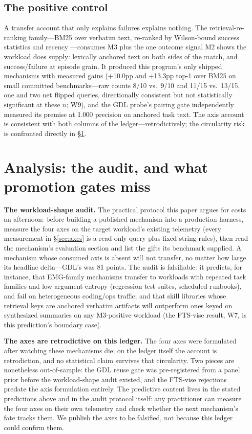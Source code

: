 \documentclass[11pt]{article}
\begin{document}
\subsection{The positive control}

A transfer account that only explains failures explains nothing. The retrieval-re-ranking family---BM25 over verbatim text, re-ranked by Wilson-bound success statistics and recency \citep{wilson1927probable}---consumes M3 plus the one outcome signal M2 shows the workload does supply: lexically anchored text on both sides of the match, and success/failure at episode grain. It produced this program's only shipped mechanisms with measured gains ($+$10.0pp and $+$13.3pp top-1 over BM25 on small committed benchmarks---raw counts 8/10 vs.\ 9/10 and 11/15 vs.\ 13/15, one and two net flipped queries, directionally consistent but not statistically significant at these $n$; W9), and the GDL probe's pairing gate independently measured its premise at 1.000 precision on anchored task text. The axis account is consistent with both columns of the ledger---retrodictively; the circularity risk is confronted directly in \S\ref{sec:analysis}.

\section{Analysis: the audit, and what promotion gates miss}
\label{sec:analysis}

\textbf{The workload-shape audit.} The practical protocol this paper argues for costs an afternoon: before building a published mechanism into a production harness, measure the four axes on the target workload's existing telemetry (every measurement in \S\ref{sec:axes} is a read-only query plus fixed string rules), then read the mechanism's evaluation section and list the gifts its benchmark supplied. A mechanism whose consumed axis is absent will not transfer, no matter how large its headline delta---GDL's was 81 points. The audit is falsifiable: it predicts, for instance, that EMG-family mechanisms transfer to workloads with repeated task families and low argument entropy (regression-test suites, scheduled runbooks), and fail on heterogeneous coding/ops traffic; and that skill libraries whose retrieval keys are anchored verbatim artifacts will outperform ones keyed on synthesized summaries on any M3-positive workload (the FTS-vise result, W7, is this prediction's boundary case).

\textbf{The axes are retrodictive on this ledger.} The four axes were formulated after watching these mechanisms die; on the ledger itself the account is retrodiction, and no statistical claim survives that circularity. Two pieces are nonetheless out-of-sample: the GDL reuse gate was pre-registered from a panel prior before the workload-shape audit existed, and the FTS-vise rejections predate the axis formulation entirely. The predictive content lives in the stated predictions above and in the audit protocol itself: any practitioner can measure the four axes on their own telemetry and check whether the next mechanism's fate tracks them. We publish the axes to be falsified, not because this ledger could confirm them.
\end{document}
